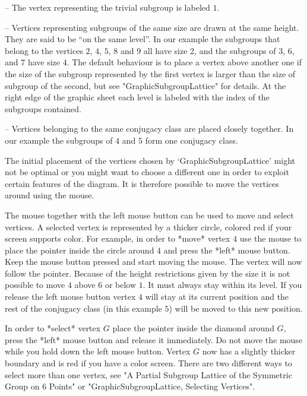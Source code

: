\beginlist
\item{--} The vertex representing the trivial subgroup is labeled $1$.
  
\item{--} Vertices representing subgroups of the same size are drawn at the
  same height. They are said to be ``on the same level''.  In our example
  the subgroups that belong to the vertices $2$, $4$, $5$, $8$ and $9$ all
  have size 2, and the subgroups of $3$, $6$, and $7$ have size $4$. The
  default behaviour is to place a vertex above another one if the size of
  the subgroup represented by the first vertex is larger than the size of
  subgroup of the second, but see "GraphicSubgroupLattice" for details. At
  the right edge of the graphic sheet each level is labeled with the index
  of the subgroups contained.
  
\item{--} Vertices belonging to the same conjugacy class are placed closely
  together.  In our example the subgroups of $4$ and $5$ form one conjugacy
  class.
\endlist

The initial placement of the vertices chosen by `GraphicSubgroupLattice'
might not be optimal or you might want to choose a different one in order
to exploit certain features of the diagram.  It is therefore possible to
move the vertices around using the mouse.

The mouse together with the left mouse button can be used to move and
select vertices. A selected vertex is represented by a thicker circle,
colored red if your screen supports color.  For example, in order to *move*
vertex $4$ use the mouse to place the pointer inside the circle around $4$
and press the *left* mouse button.  Keep the mouse button pressed and start
moving the mouse.  The vertex will now follow the pointer.  Because of the
height restrictions given by the size it is not possible to move $4$ above
$6$ or below $1$. It must always stay within its level. If you release the
left mouse button vertex $4$ will stay at its current position and the rest
of the conjugacy class (in this example $5$) will be moved to this new
position.

In  order to *select* vertex $G$  place the pointer inside the diamond
around $G$, press the *left* mouse button  and release it immediately. 
Do  not move the  mouse  while you hold down  the  left mouse button.  
Vertex $G$ now has a slightly thicker boundary and is  red if you have
a color screen.  There are two different ways  to select more than one
vertex,  see "A Partial  Subgroup Lattice of  the Symmetric Group on 6
Points" or "GraphicSubgroupLattice, Selecting Vertices".

